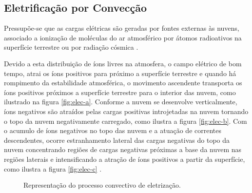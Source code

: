 \subsection{Eletrificação por Convecção}

Pressupõe-se que as cargas elétricas são geradas por fontes externas às nuvens, associado a ionização de moléculas do ar atmosférico por átomos radioativos na superfície terrestre ou por radiação cósmica \cite{wilson1956,grenet1947, vonnegut1962,phillips1967}.

Devido a esta distribuição de íons livres na atmosfera, o campo elétrico de bom tempo, atrai os íons positivos para próximo a superfície terrestre e quando há rompimento da estabilidade atmosférica, o movimento ascendente transporta os íons positivos próximos a superfície terrestre para o interior das nuvem, como ilustrado na figura \ref{fig:elec-a}. Conforme a nuvem se desenvolve verticalmente, íons negativos são atraídos pelas cargas positivas introjetadas na nuvem tornando o topo da nuvem negativamente carregado, como ilustra a figura \ref{fig:elec-b}. Com o acumulo de íons negativos no topo das nuvem e a atuação de correntes descendentes, ocorre estranhamento lateral das cargas negativas do topo da nuvem concentrando regiões de cargas negativas próximas a base da nuvem nas regiões laterais e intensificando a atração de íons positivos a partir da superfície, como ilustra a figura \ref{fig:elec-c} \cite{vonnegut1962,wagner1981,vonnegut1995}.


\begin{figure}[ht]
   \centering
   \caption{Representação do processo convectivo de eletrização.}
   \label{fig:elec}
\end{figure}

